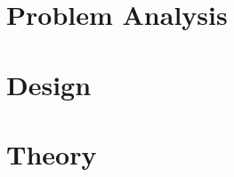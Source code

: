 



\chapter{Problem Analysis}







\chapter{Design}

\chapter{Theory}



\begingroup
	\raggedright
\endgroup

